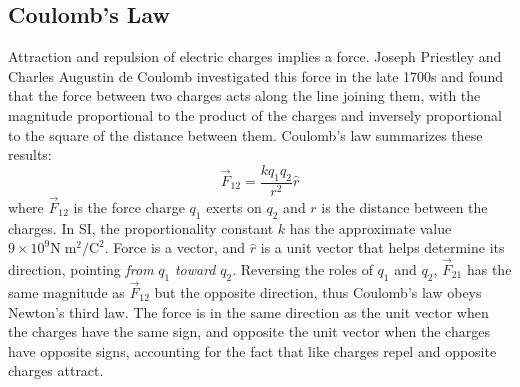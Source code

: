 \documentclass[a4paper]{article}
\begin{document}
\subsection{Coulomb's Law}
Attraction and repulsion of electric charges implies a force. Joseph Priestley and Charles Augustin de Coulomb investigated this force in the late 1700s and found that the force between two charges acts along the line joining them, with the magnitude proportional to the product of the charges and inversely proportional to the square of the distance between them. Coulomb's law summarizes these results:
\begin{equation}
    \vec{F}_{12} = \frac{kq_1q_2}{r^2}\hat{r}
\end{equation}
where $\vec{F}_{12}$ is the force charge $q_1$ exerts on $q_2$ and $r$ is the distance between the charges. In SI, the proportionality constant $k$ has the approximate value $9 \times 10^9 \text{N}\; \text{m}^2/\text{C}^2$. Force is a vector, and $\hat{r}$ is a unit vector that helps determine its direction, pointing \textit{from} $q_1$ \textit{toward} $q_2$. Reversing the roles of $q_1$ and $q_2$, $\vec{F}_{21}$ has the same magnitude as $\vec{F}_{12}$ but the opposite direction, thus Coulomb's law obeys Newton's third law. The force is in the same direction as the unit vector when the charges have the same sign, and opposite the unit vector when the charges have opposite signs, accounting for the fact that like charges repel and opposite charges attract.
\end{document}
